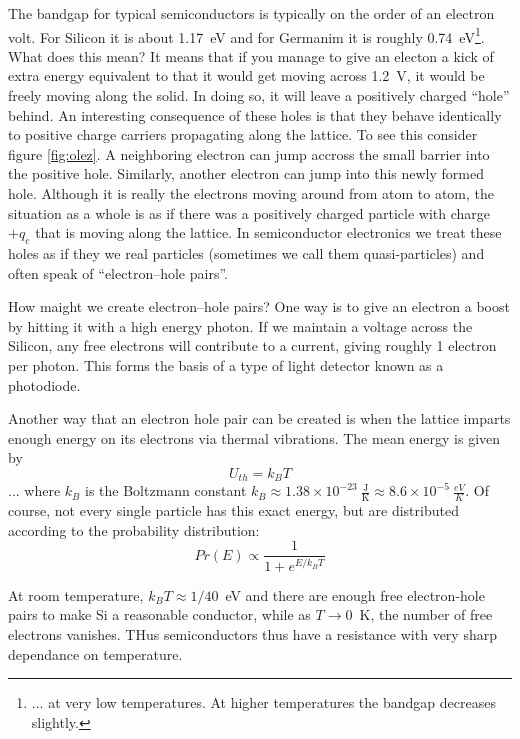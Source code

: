 \documentclass{tufte-book}
\begin{document}
The bandgap for typical semiconductors is typically on the order of an electron volt. For Silicon it is about 1.17~eV and for Germanim it is roughly 0.74~eV\footnote{... at very low temperatures. At higher temperatures the bandgap decreases slightly.}. What does this mean? It means that if you manage to give an electon a kick of extra energy equivalent to that it would get moving across 1.2~V, it would be freely moving along the solid. In doing so, it will leave a positively charged ``hole'' behind. An interesting consequence of these holes is that they behave identically to positive charge carriers propagating along the lattice. To see this consider figure \ref{fig:olez}. A neighboring electron can jump accross the small barrier into the positive hole. Similarly, another electron can jump into this newly formed hole. Although it is really the electrons moving around from atom to atom, the situation as a whole is as if there was a positively charged particle with charge $+q_e$ that is moving along the lattice. In semiconductor electronics we treat these holes as if they we real particles (sometimes we call them quasi-particles) and often speak of ``electron--hole pairs''.

How maight we create electron--hole pairs? One way is to give an electron a boost by hitting it with a high energy photon. If we maintain a voltage across the Silicon, any free electrons will contribute to a current, giving roughly 1 electron per photon. This forms the basis of a type of light detector known as a photodiode.

Another way that an electron hole pair can be created is when the lattice imparts enough energy on its electrons via thermal vibrations. The mean energy is given by 
\begin{equation}
\label{eq:thermal_energy}
U_{th} = k_BT
\end{equation}
\noindent ... where $k_B$ is the Boltzmann constant $k_B \approx 1.38\times10^{-23}~\frac{\text{J}}{\text{K}}\approx 8.6\times10^{-5}~\frac{eV}{K}$. Of course, not every single particle has this exact energy, but are distributed according to the probability distribution:
\begin{equation}
\label{eq:thermal_distn}
Pr(E) \propto \frac{1}{1+e^{E/k_BT}}
\end{equation}

\noindent At room temperature, $k_BT\approx 1/40$~eV and there are enough free electron-hole pairs to make Si a reasonable conductor, while as $T\rightarrow0$~K, the number of free electrons vanishes. THus semiconductors thus have a resistance with very sharp dependance on temperature. 
\end{document}
